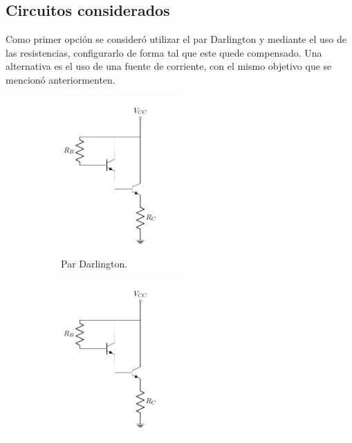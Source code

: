\subsection{Circuitos considerados}
Como primer opción se consideró utilizar el par Darlington y mediante el uso de las resistencias, configurarlo de forma tal que este quede compensado. Una alternativa es el uso de una fuente de corriente, con el mismo objetivo que se mencionó anteriormenten.
\begin{figure}[H]
\centering
\begin{subfigure}{.4\textwidth}
\centering
	\includegraphics[width=0.5\textwidth, page=1]{Imagenes/ParDarlington.pdf}
	\caption{Par Darlington.}
	\label{fig:pardar1}
\end{subfigure}
\begin{subfigure}{.4\textwidth}
\centering
	\includegraphics[width=0.5\textwidth, page=2]{Imagenes/ParDarlington.pdf}

\end{subfigure}
\end{figure}

